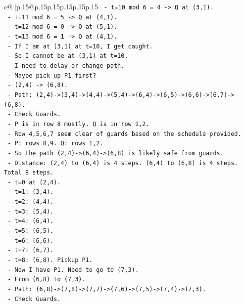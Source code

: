 \documentclass{article}
\begin{document}
{\begin{supertabular}{c@{$\;$}|p{.15\linewidth}@{}p{.15\linewidth}p{.15\linewidth}p{.15\linewidth}p{.15\linewidth}p{.15\linewidth}}
{{{\texttt{    {-} t=10 mod 6 = 4 {-}> Q at (3,1).} \\
\texttt{    {-} t=11 mod 6 = 5 {-}> Q at (4,1).} \\
\texttt{    {-} t=12 mod 6 = 0 {-}> Q at (5,1).} \\
\texttt{    {-} t=13 mod 6 = 1 {-}> Q at (4,1).} \\
\texttt{    {-} If I am at (3,1) at t=10, I get caught.} \\
\texttt{    {-} So I cannot be at (3,1) at t=10.} \\
\texttt{    {-} I need to delay or change path.} \\
\texttt{    {-} Maybe pick up P1 first?} \\
\texttt{    {-} (2,4) {-}> (6,8).} \\
\texttt{    {-} Path: (2,4){-}>(3,4){-}>(4,4){-}>(5,4){-}>(6,4){-}>(6,5){-}>(6,6){-}>(6,7){-}>(6,8).} \\
\texttt{    {-} Check Guards.} \\
\texttt{    {-} P is in row 8 mostly. Q is in row 1,2.} \\
\texttt{    {-} Row 4,5,6,7 seem clear of guards based on the schedule provided.} \\
\texttt{    {-} P: rows 8,9. Q: rows 1,2.} \\
\texttt{    {-} So the path (2,4){-}>(6,4){-}>(6,8) is likely safe from guards.} \\
\texttt{    {-} Distance: (2,4) to (6,4) is 4 steps. (6,4) to (6,8) is 4 steps. Total 8 steps.} \\
\texttt{    {-} t=0 at (2,4).} \\
\texttt{    {-} t=1: (3,4).} \\
\texttt{    {-} t=2: (4,4).} \\
\texttt{    {-} t=3: (5,4).} \\
\texttt{    {-} t=4: (6,4).} \\
\texttt{    {-} t=5: (6,5).} \\
\texttt{    {-} t=6: (6,6).} \\
\texttt{    {-} t=7: (6,7).} \\
\texttt{    {-} t=8: (6,8). Pickup P1.} \\
\texttt{    {-} Now I have P1. Need to go to (7,3).} \\
\texttt{    {-} From (6,8) to (7,3).} \\
\texttt{    {-} Path: (6,8){-}>(7,8){-}>(7,7){-}>(7,6){-}>(7,5){-}>(7,4){-}>(7,3).} \\
\texttt{    {-} Check Guards.} \\
}}}
\end{supertabular}}
\end{document}
